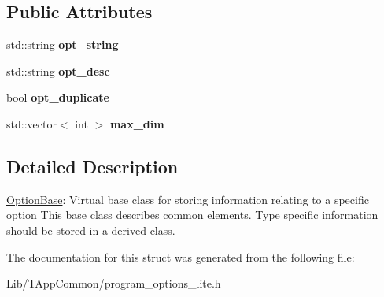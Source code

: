 \subsection*{Public Attributes}
\begin{DoxyCompactItemize}
\item 
\mbox{\label{structdf_1_1program__options__lite_1_1_option_base_a69d5385baaf7b8261d7452bfaaa913be}} 
std\+::string {\bfseries opt\+\_\+string}
\item 
\mbox{\label{structdf_1_1program__options__lite_1_1_option_base_a7a5403f473fe8c04fca4dcf2546592ea}} 
std\+::string {\bfseries opt\+\_\+desc}
\item 
\mbox{\label{structdf_1_1program__options__lite_1_1_option_base_aabf5b65dac0574ab3bba15b1136a33df}} 
bool {\bfseries opt\+\_\+duplicate}
\item 
\mbox{\label{structdf_1_1program__options__lite_1_1_option_base_aa219ad152c828cbef1ff48ddbcdbc40f}} 
std\+::vector$<$ int $>$ {\bfseries max\+\_\+dim}
\end{DoxyCompactItemize}


\subsection{Detailed Description}
\hyperlink{structdf_1_1program__options__lite_1_1_option_base}{Option\+Base}\+: Virtual base class for storing information relating to a specific option This base class describes common elements. Type specific information should be stored in a derived class. 

The documentation for this struct was generated from the following file\+:\begin{DoxyCompactItemize}
\item 
Lib/\+T\+App\+Common/program\+\_\+options\+\_\+lite.\+h\end{DoxyCompactItemize}
